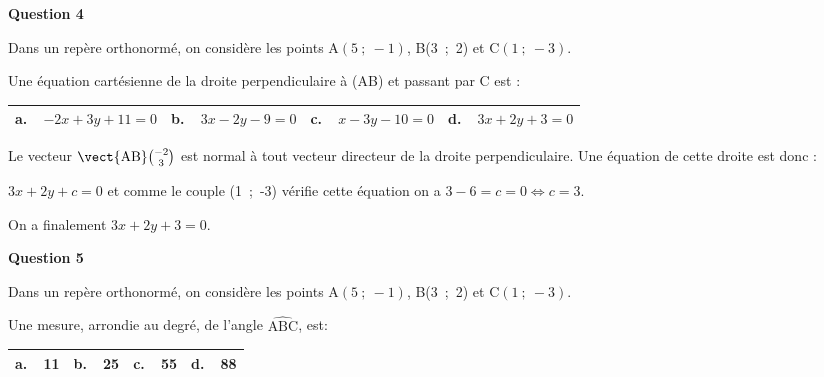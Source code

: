 \bigskip

\textbf{Question 4}

\medskip

Dans un repère orthonormé, on considère les points A$(5~;~-1)$, B(3~;~2) et C$(1~;~-3)$.

Une équation cartésienne de la droite perpendiculaire à (AB) et passant par C est :
 
\begin{center}
\begin{tabularx}{\linewidth}{|*{4}{X|}}\hline
\textbf{a.~~}$-2x + 3y + 11 = 0$&\textbf{b.~~}$3x - 2y - 9 = 0$&\textbf{c.~~}$x - 3y - 10 = 0$&\textbf{d.~~}$3x +2y +3 = 0$\\ \hline
\end{tabularx}
\end{center} 
Le vecteur $\vect{\text{AB}}\binom{-2}{3}$ est normal à tout vecteur directeur de la droite perpendiculaire. Une équation de cette droite est donc :

$3x + 2y + c = 0$ et comme le couple (1~;~-3) vérifie cette équation on a $3 - 6 = c = 0 \iff c  = 3$.

On a finalement $3x + 2y + 3 = 0$. 
\bigskip

\textbf{Question 5}

\medskip

Dans un repère orthonormé, on considère les points A$(5~;~-1)$, B(3~;~2) et C$(1~;~-3)$.

Une mesure, arrondie au degré, de l'angle $\widehat{\text{ABC}}$, est:

\begin{center}
\begin{tabularx}{\linewidth}{|*{4}{X|}}\hline
\textbf{a.~~}11&\textbf{b.~~}25&\textbf{c.~~}55&\textbf{d.~~}88\\ \hline
\end{tabularx}
\end{center} 

\bigskip
